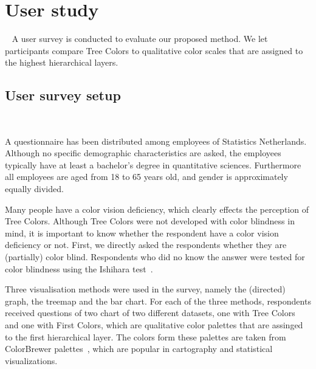 \documentclass[journal]{vgtc}                %
\begin{document}
\section{User study}~\label{secuser}
A user survey is conducted to evaluate our proposed method. We let participants compare Tree Colors to qualitative color scales that are assigned to the highest hierarchical layers.


\subsection{User survey setup}~\label{secusersetup}

A questionnaire has been distributed among employees of Statistics Netherlands. Although no specific demographic characteristics are asked, the employees typically have at least a bachelor's degree in quantitative sciences. Furthermore all employees are aged from 18 to 65 years old, and gender is approximately equally divided.

Many people have a color vision deficiency, which clearly effects the perception of Tree Colors. Although Tree Colors were not developed with color blindness in mind, it is important to know whether the respondent have a color vision deficiency or not. First, we directly asked the respondents whether they are (partially) color blind. Respondents who did no know the answer were tested for color blindness using the Ishihara test~\cite{ishihara}. 

Three visualisation methods were used in the survey, namely the (directed) graph, the treemap and the bar chart. For each of the three methods, respondents received questions of two chart of two different datasets, one with Tree Colors and one with First Colors, which are qualitative color palettes that are assinged to the first hierarchical layer. The colors form these palettes are taken from ColorBrewer palettes~\cite{brewer03}, which are popular in cartography and statistical visualizations.
\end{document}
